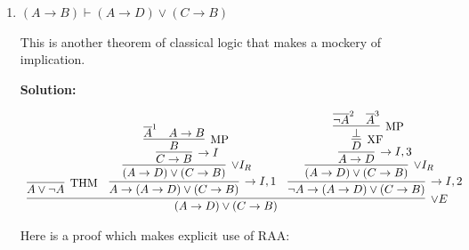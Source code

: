 \documentclass[11pt]{report}
\newcommand{\temp}[2]{{\overline{#2}}^{#1}}
\begin{document}
\begin{enumerate}
\begin{enumerate}
		We can prove this using LEM as follows: 

		\begin{center}
			$\begin{array}{c}
				\infer[\to I,1]{(\lnot A \to A) \to A}
					{\infer[\lor E]{A}
						{\infer[\LEM]{A \lor \lnot A}{}
						&
						\infer[\THM]{A \to A}{}
						&
						\infer[1]{\lnot A \to A}{}}}
			\end{array}$
		\end{center}

		Proof which makes explicit use of RAA: 

		\begin{center}
			$\begin{array}{c}
				\infer[\to I,1]{(\lnot A \to A) \to A}
					{\infer[\RAA,2]{A}
						{\infer[\MP]{\bot}
							{\infer[\MP]{A}
								{\infer[1]{\cancel{\lnot A \to A}}{} & \infer[2]{\cancel{\lnot A}}{}} 
							&
							\infer[2]{\cancel{\lnot A}}{}}}}
			\end{array}$
		\end{center}		
		
		\item $(A \to B)  \vdash (A \rightarrow  D) \lor (C \rightarrow B)$
		
		This is another theorem of classical logic that makes a mockery of implication. 
		
		\textbf{Solution:}

		\begin{tiny}
		\begin{center}
			$\begin{array}{c}
				\infer[\lor E]{(A \to D) \lor (C \to B)}
					{\infer[\THM]{A \lor \lnot A}{}
					&
					\infer[\to I,1]{A \to (A \to D) \lor (C \to B)}
						{\infer[\lor I_{R}]{(A \to D) \lor (C \to B)}
							{\infer[\to I]{C \to B}
								{\infer[\MP]{B}
									{\temp{1}{A}
									&
									A \to B}}}}
					&
					\infer[\to I,2]{\lnot A \to (A \to D) \lor (C \to B)}
						{\infer[\lor I_{R}]{(A \to D) \lor (C \to B)}
							{\infer[\to I,3]{A \to D}
								{\infer[\XF]{D}
									{\infer[\MP]{\bot}
										{\temp{2}{\lnot A}
										&
										\temp{3}{A}}}}}}}
			\end{array}$
		\end{center}
	\end{tiny}

		Here is a proof which makes explicit use of RAA: 


\end{enumerate}
\end{enumerate}
\end{document}
